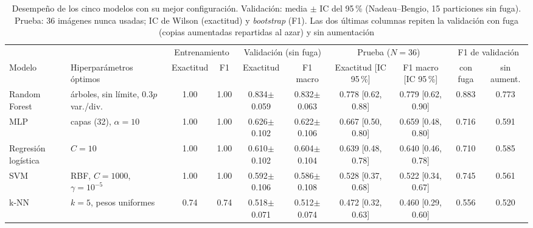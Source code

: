 \begin{table}[!t]
\caption{Desempeño de los cinco modelos con su mejor configuración. Validación: media $\pm$ IC del 95\,\% (Nadeau--Bengio, 15 particiones sin fuga). Prueba: 36 imágenes nunca usadas; IC de Wilson (exactitud) y \emph{bootstrap} (F1). Las dos últimas columnas repiten la validación con fuga (copias aumentadas repartidas al azar) y sin aumentación}
\label{tab:res}
\centering\footnotesize
\setlength{\tabcolsep}{2.7pt}\renewcommand{\arraystretch}{1.08}
\begin{tabular}{@{}l >{\raggedright\arraybackslash}p{3.0cm} c c c c c c c c@{}}
\toprule
 & & \multicolumn{2}{c}{Entrenamiento} & \multicolumn{2}{c}{Validación (sin fuga)} & \multicolumn{2}{c}{Prueba ($N=36$)} & \multicolumn{2}{c}{F1 de validación} \\
\cmidrule(lr){3-4}\cmidrule(lr){5-6}\cmidrule(lr){7-8}\cmidrule(l){9-10}
Modelo & Hiperparámetros óptimos & Exactitud & F1 & Exactitud & F1 macro & Exactitud [IC 95\,\%] & F1 macro [IC 95\,\%] & con fuga & sin aument. \\
\midrule
Random Forest & 100 árboles, sin límite, 0.3$p$ var./div. & 1.00 & 1.00 & 0.834$\pm$0.059 & 0.832$\pm$0.063 & 0.778 [0.62, 0.88] & 0.779 [0.62, 0.90] & 0.883 & 0.773 \\
MLP & capas (32), $\alpha=10$ & 1.00 & 1.00 & 0.626$\pm$0.102 & 0.622$\pm$0.106 & 0.667 [0.50, 0.80] & 0.659 [0.48, 0.80] & 0.716 & 0.591 \\
Regresión logística & $C=10$ & 1.00 & 1.00 & 0.610$\pm$0.102 & 0.604$\pm$0.104 & 0.639 [0.48, 0.78] & 0.640 [0.46, 0.78] & 0.710 & 0.585 \\
SVM & RBF, $C=1000$, $\gamma=10^{-5}$ & 1.00 & 1.00 & 0.592$\pm$0.106 & 0.586$\pm$0.108 & 0.528 [0.37, 0.68] & 0.522 [0.34, 0.67] & 0.745 & 0.561 \\
k-NN & $k=5$, pesos uniformes & 0.74 & 0.74 & 0.518$\pm$0.071 & 0.512$\pm$0.074 & 0.472 [0.32, 0.63] & 0.460 [0.29, 0.60] & 0.556 & 0.520 \\
\bottomrule
\end{tabular}
\end{table}
